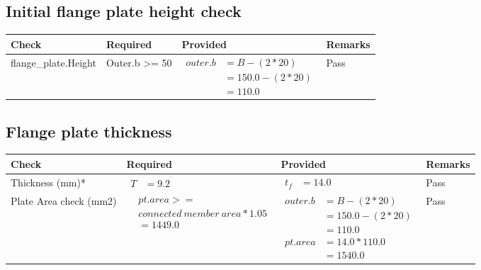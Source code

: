 \documentclass{article}%
\begin{document}
%
\newpage%
\subsection{Initial flange plate height check}%
\label{subsec:Initialflangeplateheightcheck}%
\renewcommand{\arraystretch}{1.2}%
\begin{longtable}{|p{4.5cm}|p{2.5cm}|p{7cm}|p{1.5cm}|}%
\hline%
\rowcolor{OsdagGreen}%
Check&Required&Provided&Remarks\\%
\hline%
\endhead%
\hline%
flange\_plate.Height&Outer.b >= 50&$\begin{aligned} outer.b &= B-(2*20)\\ &=150.0-(2*20)\\ &= 110.0\end{aligned}$&Pass\\%
\hline%
\end{longtable}

%
\newpage%
\subsection{Flange plate thickness}%
\label{subsec:Flangeplatethickness}%
\renewcommand{\arraystretch}{1.2}%
\begin{longtable}{|p{2.5cm}|p{4.5cm}|p{7cm}|p{1.5cm}|}%
\hline%
\rowcolor{OsdagGreen}%
Check&Required&Provided&Remarks\\%
\hline%
\endhead%
\hline%
Thickness (mm)*&$\begin{aligned} T &=9.2\end{aligned}$&$\begin{aligned} t_f &=14.0\end{aligned}$&Pass\\%
\hline%
Plate Area check (mm2)&$\begin{aligned} &pt.area >= \\&connected~member~area * 1.05\\  &= 1449.0\end{aligned}$&$\begin{aligned} outer.b &= B - (2 * 20)\\ &= 150.0 - (2 * 20)\\ &= 110.0 \\  pt.area &= 14.0 * 110.0\\ &= 1540.0\end{aligned}$&Pass\\%
\hline%
\end{longtable}

%
\newpage%
\end{document}
